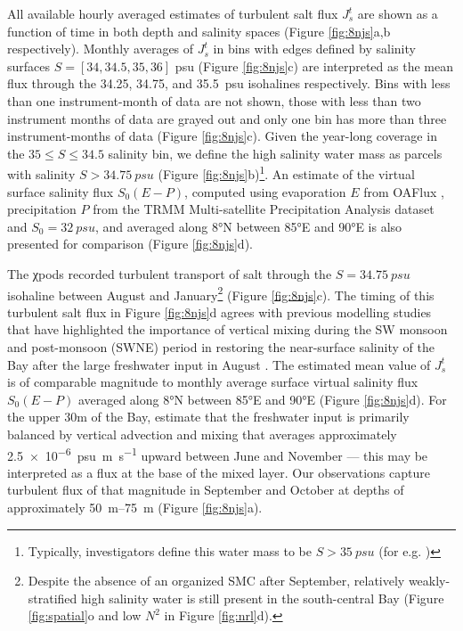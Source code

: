 \documentclass[twocol]{ametsoc}
\begin{document}
All available hourly averaged estimates of turbulent salt flux \(J_s^t\) are shown as a function of time in both depth and salinity spaces (Figure \ref{fig:8njs}a,b respectively).
Monthly averages of \(J_s^t\) in bins with edges defined by salinity surfaces \(S=[34, 34.5, 35, 36]\) \si{psu} (Figure \ref{fig:8njs}c) are interpreted as the mean flux through the 34.25, 34.75, and \SI{35.5}{psu} isohalines respectively.
Bins with less than one instrument-month of data are not shown, those with less than two instrument months of data are grayed out and only one bin has more than three instrument-months of data (Figure \ref{fig:8njs}c).
Given the year-long coverage in the \(35 ≤ S ≤ 34.5\) salinity bin, we define the high salinity water mass as parcels with salinity \(S > \SI{34.75}{psu}\) (Figure \ref{fig:8njs}b)\footnote{Typically, investigators define this water mass to be \(S > \SI{35}{psu}\) (for e.g. \citealp{Vinayachandran2013})}.
An estimate of the virtual surface salinity flux \(S_0(E-P)\), computed using evaporation \(E\) from OAFlux \citep{oaflux}, precipitation \(P\) from the TRMM Multi-satellite Precipitation Analysis dataset \citep{trmm} and \(S_0 = \SI{32}{psu}\), and averaged along 8°N between 85°E and 90°E  is also presented for comparison (Figure \ref{fig:8njs}d).

The χpods recorded turbulent transport of salt through the \(S=\SI{34.75}{psu}\) isohaline between August and January\footnote{Despite the absence of an organized SMC after September, relatively weakly-stratified high salinity water is still present in the south-central Bay (Figure \ref{fig:spatial}o and low \(N^2\) in Figure \ref{fig:nrl}d).} (Figure \ref{fig:8njs}c).
The timing of this turbulent salt flux in Figure \ref{fig:8njs}d agrees with previous modelling studies that have highlighted the importance of vertical mixing during the SW monsoon and post-monsoon (SWNE) period in restoring the near-surface salinity of the Bay after the large freshwater input in August \citep{Benshila2014,Akhil2014,Wilson2016a}.
The estimated mean value of \(J_s^t\) is of comparable magnitude to monthly average surface virtual salinity flux \(S_0(E-P)\) averaged along 8°N between 85°E and 90°E (Figure \ref{fig:8njs}d).
For the upper 30m of the Bay, \cite{Wilson2016a} estimate that the freshwater input is primarily balanced by vertical advection and mixing that averages approximately \SI{2.5e-6}{psu \m\per\s} upward between June and November --- this may be interpreted as a flux at the base of the mixed layer.
Our observations capture turbulent flux of that magnitude in September and October at depths of approximately \SIrange{50}{75}{m} (Figure \ref{fig:8njs}a).
\end{document}
